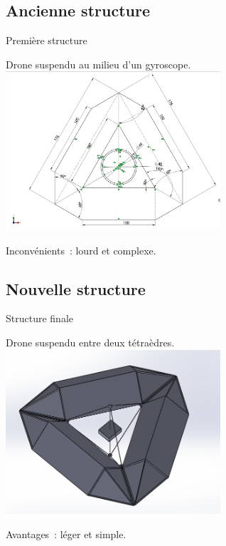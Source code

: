 \documentclass{beamer}
\begin{document}
\subsection{Ancienne structure}

\begin{frame}{Première structure}
 \begin{center}
	Drone suspendu au milieu d'un gyroscope.
  \includegraphics[width=8cm]{../Images/structure0_0.jpg}
 \end{center}
 Inconvénients~: lourd et complexe.
\end{frame}


\subsection{Nouvelle structure}

\begin{frame}{Structure finale}
 \begin{center}
	Drone suspendu entre deux tétraèdres.
  \includegraphics[width=8cm]{../Images/structure1_0.PNG}
 \end{center}
 Avantages~: léger et simple.
\end{frame}
\end{document}
